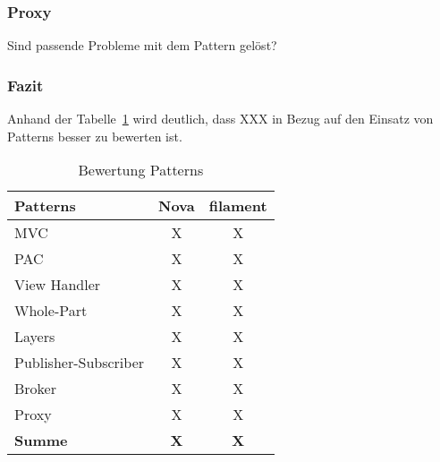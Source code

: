 \subsubsection{Proxy}
\color{red}
Sind passende Probleme mit dem Pattern gelöst?
\color{black}

\subsubsection{Fazit}

\color{red}
Anhand der Tabelle~\ref{tab:bewertung-patterns} wird deutlich, dass XXX in Bezug auf den Einsatz von Patterns besser zu bewerten ist.

\begin{table}[]
    \caption{Bewertung Patterns}
    \label{tab:bewertung-patterns}
    \centering
    \begin{tabular}{|l|c|c|}
        \hline
        \textbf{Patterns}    & \textbf{Nova} & \textbf{filament} \\ \hline
        MVC                  & X             & X                 \\ \hline
        PAC                  & X             & X                 \\ \hline
        View Handler         & X             & X                 \\ \hline
        Whole-Part           & X             & X                 \\ \hline
        Layers               & X             & X                 \\ \hline
        Publisher-Subscriber & X             & X                 \\ \hline
        Broker               & X             & X                 \\ \hline
        Proxy                & X             & X                 \\ \hline
        \textbf{Summe}       & \textbf{X}    & \textbf{X}        \\ \hline
    \end{tabular}
\end{table}
\color{black}

